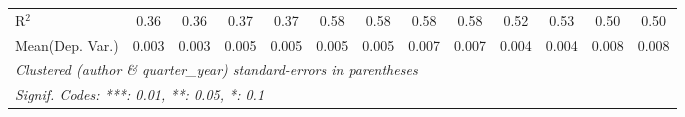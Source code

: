 \begin{tabular}{lcccccccccccc}
   R$^2$                                    & 0.36          & 0.36           & 0.37    & 0.37          & 0.58    & 0.58     & 0.58    & 0.58     & 0.52    & 0.53          & 0.50    & 0.50\\  
Mean(Dep. Var.) & 0.003 & 0.003 & 0.005 & 0.005 & 0.005 & 0.005 & 0.007 & 0.007 & 0.004 & 0.004 & 0.008 & 0.008 \\
   \midrule \midrule
   \multicolumn{13}{l}{\emph{Clustered (author \& quarter\_year) standard-errors in parentheses}}\\
   \multicolumn{13}{l}{\emph{Signif. Codes: ***: 0.01, **: 0.05, *: 0.1}}\\
\end{tabular}
\par\endgroup
